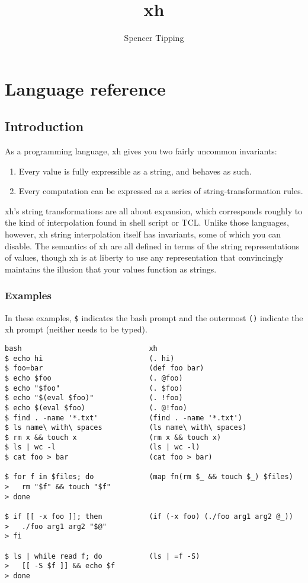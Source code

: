 \documentclass{report}
\title{xh}
\author{Spencer Tipping}
\begin{document}
\maketitle{}
\tableofcontents{}


\part{Language reference}\label{part:language-reference}
\chapter{Introduction}\label{chp:introduction}
  As a programming language, xh gives you two fairly uncommon invariants:

\begin{enumerate}
\item{Every value is fully expressible as a string, and behaves as such.}
       \label{item:values-are-strings}
\item{Every computation can be expressed as a series of}
       string-transformation rules.
       \label{item:computation-is-transformation}
\end{enumerate}

  xh's string transformations are all about expansion, which corresponds
  roughly to the kind of interpolation found in shell script or TCL. Unlike
  those languages, however, xh string interpolation itself has invariants, some
  of which you can disable. The semantics of xh are all defined in terms of the
  string representations of values, though xh is at liberty to use any
  representation that convincingly maintains the illusion that your values
  function as strings.

\section{Examples}\label{sec:examples}
    In these examples, \verb|$| indicates the bash prompt and the outermost
    \verb|()| indicate the xh prompt (neither needs to be typed).

\begin{verbatim}
bash                              xh
$ echo hi                         (. hi)
$ foo=bar                         (def foo bar)
$ echo $foo                       (. @foo)
$ echo "$foo"                     (. $foo)
$ echo "$(eval $foo)"             (. !foo)
$ echo $(eval $foo)               (. @!foo)
$ find . -name '*.txt'            (find . -name '*.txt')
$ ls name\ with\ spaces           (ls name\ with\ spaces)
$ rm x && touch x                 (rm x && touch x)
$ ls | wc -l                      (ls | wc -l)
$ cat foo > bar                   (cat foo > bar)

$ for f in $files; do             (map fn(rm $_ && touch $_) $files)
>   rm "$f" && touch "$f"
> done

$ if [[ -x foo ]]; then           (if (-x foo) (./foo arg1 arg2 @_))
>   ./foo arg1 arg2 "$@"
> fi

$ ls | while read f; do           (ls | =f -S)
>   [[ -S $f ]] && echo $f
> done
\end{verbatim}
\end{document}
